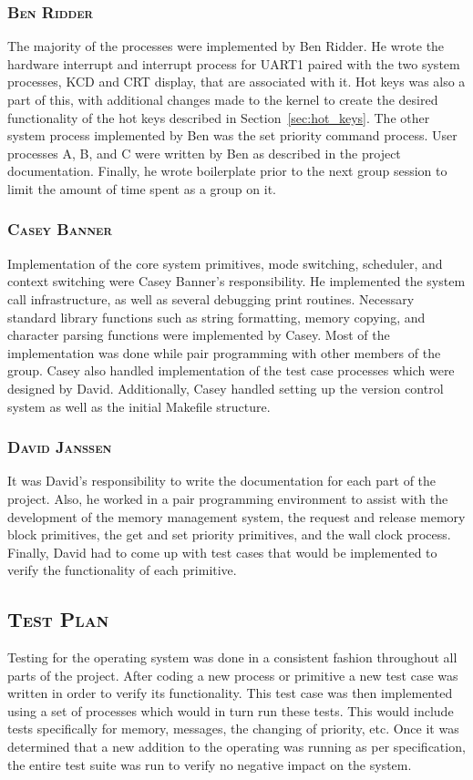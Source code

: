 \documentclass[oneside]{report}
\begin{document}
\subsubsection{\textsc{Ben Ridder}}
The majority of the processes were implemented by Ben Ridder. He wrote the
hardware interrupt and interrupt process for UART1 paired with the two system
processes, KCD and CRT display, that are associated with it. Hot keys was also
a part of this, with additional changes made to the kernel to create the
desired functionality of the hot keys described in Section~\ref{sec:hot_keys}.
The other system process implemented by Ben was the set priority command
process. User processes A, B, and C were written by Ben as described in the
project documentation. Finally, he wrote boilerplate prior to the next group
session to limit the amount of time spent as a group on it.

\subsubsection{\textsc{Casey Banner}}

Implementation of the core system primitives, mode switching,
scheduler, and context switching were Casey Banner's
responsibility. He implemented the system call infrastructure, as well
as several debugging print routines. Necessary standard library
functions such as string formatting, memory copying, and character
parsing functions were implemented by Casey. Most of the
implementation was done while pair programming with other members of
the group. Casey also handled implementation of the test case processes
which were designed by David. Additionally, Casey handled setting up
the version control system as well as the initial Makefile structure.

\subsubsection{\textsc{David Janssen}}
It was David's responsibility to write the documentation for each part of the 
project. Also, he worked in a pair programming environment to assist with the 
development of the memory management system, the request and release memory 
block primitives, the get and set priority primitives, and the wall clock 
process. Finally,  David had to come up with test cases that would be 
implemented to verify the functionality of each primitive.   

\subsection{\textsc{Test Plan}}
Testing for the operating system was done in a consistent fashion throughout all
parts of the project. After coding a new process or primitive a new test case 
was written in order to verify its functionality. This test case was then 
implemented using a set of processes which would in turn run these tests. This 
would include tests specifically for memory, messages, the changing of priority, 
etc. Once it was determined that a new addition to the operating was running as 
per specification, the entire test suite was run to verify no negative impact on 
the system. 
\end{document}
